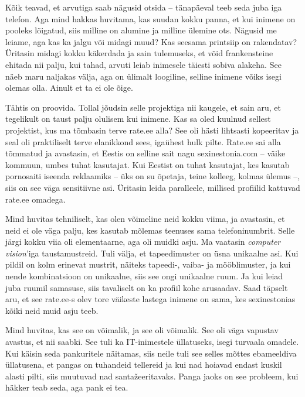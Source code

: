 Kõik teavad, et arvutiga saab nägusid otsida -- tänapäeval teeb seda juba iga 
telefon. Aga mind hakkas huvitama, kas suudan kokku panna, et kui 
inimene on pooleks lõigatud, siis milline on alumine ja milline ülemine ots. 
Nägusid me leiame, aga kas ka jalgu või midagi 
muud? Kas seesama printsiip on rakendatav? Üritasin midagi kokku käkerdada ja 
sain tulemuseks, et võid frankensteine ehitada nii palju, kui tahad, 
arvuti leiab inimesele täiesti sobiva alakeha. See näeb maru naljakas välja, 
aga on ülimalt loogiline, selline inimene võiks isegi 
olemas olla. Ainult et ta ei ole õige. 

Tähtis on proovida. Tollal jõudsin selle projektiga 
nii kaugele, et sain aru, et tegelikult on taust palju olulisem kui inimene. 
Kas sa oled kuulnud sellest projektist, kus ma tõmbasin terve 
rate.ee alla? See oli hästi lihtsasti 
kopeeritav ja seal oli praktiliselt terve elanikkond sees, igaühest 
hulk pilte. Rate.ee sai alla tõmmatud ja avastasin, et Eestis on
selline sait nagu sexinestonia.com -- väike kommuun, umbes tuhat kasutajat. Kui 
Eestist on tuhat kasutajat, kes kasutab pornosaiti iseenda reklaamiks -- üks on su õpetaja, teine kolleeg, kolmas ülemus --, 
siis on see väga sensitiivne asi. Üritasin leida paralleele, millised 
profiilid kattuvad rate.ee omadega. 

Mind huvitas tehniliselt, kas olen võimeline neid kokku viima, ja 
avastasin, et neid ei ole väga palju, kes kasutab mõlemas teenuses sama 
telefoninumbrit. Selle järgi kokku viia oli elementaarne, aga oli 
muidki asju. Ma vaatasin \emph{computer vision}'iga taustamustreid. Tuli välja, et tapeedimuster on üsna unikaalne asi. Kui 
pildil on kolm erinevat mustrit, näiteks tapeedi-, vaiba- ja mööblimuster, ja kui nende kombinatsioon on unikaalne, 
siis see ongi unikaalne ruum. Ja kui leiad juba ruumil samasuse, siis 
tavaliselt on ka profiil kohe arusaadav. Saad täpselt aru, et see 
rate.ee-s olev tore väikeste lastega inimene on sama, kes sexinestonias 
kõiki neid muid asju teeb. 


Mind huvitas, kas see on võimalik, ja see oli võimalik. See oli väga 
vapustav avastus, et nii saabki. See tuli ka IT-inimestele üllatuseks, 
isegi turvaala omadele. Kui käisin seda pankuritele 
näitamas, siis neile tuli see selles mõttes ebameeldiva üllatusena, et 
pangas on tuhandeid tellereid ja kui nad hoiavad endast kuskil alasti pilti, siis
muutuvad nad santažeeritavaks. Panga jaoks on see probleem, kui häkker 
teab seda, aga pank ei tea. 

